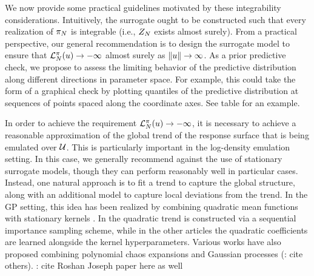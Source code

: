 \documentclass[12pt]{article}
\begin{document}
We now provide some practical guidelines motivated by these integrability considerations.
Intuitively, the surrogate ought to be constructed such that every realization of $\postEm[\Ndesign]$
is integrable (i.e., $\normCstEm$ exists almost surely). From a practical perspective, our general 
recommendation is to design the surrogate model to ensure that $\lpostEm[\Ndesign](\Par) \to -\infty$
almost surely as $\norm{\Par} \to \infty$. As a prior predictive check, we propose to   
assess the limiting behavior of the predictive distribution along different directions in parameter
space. For example, this could take the form of a graphical check by plotting quantiles of 
the predictive distribution at sequences of points spaced along the coordinate axes. 
See table \todo for an example. 

In order to achieve the requirement $\lpostEm[\Ndesign](\Par) \to -\infty$, it is 
necessary to achieve a reasonable approximation of the global trend of the response 
surface that is being emulated over $\parSpace$. This is particularly important in the
log-density emulation setting. In this case, we generally recommend against the use of 
stationary surrogate models, though they can perform reasonably well in particular cases.
Instead, one natural approach is to fit a trend to capture the global structure, along with an 
additional model to capture local deviations from the trend. In the GP setting, this idea has 
been realized by combining quadratic mean functions with stationary kernels 
\citep{emPostDens,SinsbeckNowak,VehtariParallelGP,llikEmABC,ABCGP,pseudoMarginalGP}. In 
\citet{emPostDens} the quadratic trend is constructed via a sequential importance sampling
scheme, while in the other articles the quadratic coefficients are learned alongside the 
kernel hyperparameters. Various works have also proposed combining polynomial chaos
expansions and Gaussian processes \citep{SinsbeckNowak} (\todo: cite others).
\todo: cite Roshan Joseph paper here as well
\end{document}
